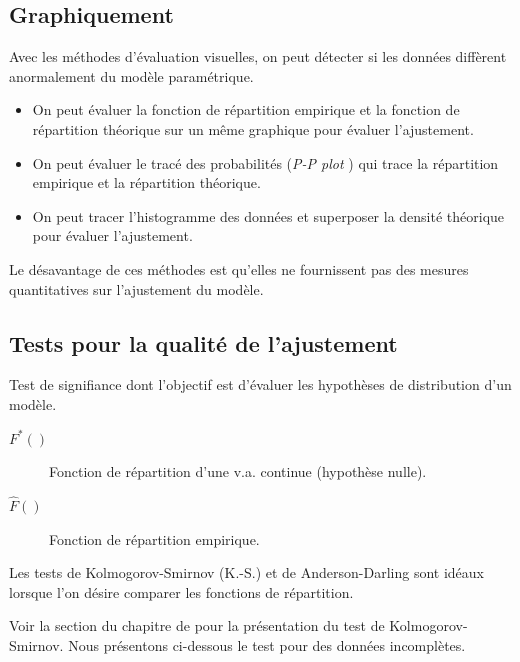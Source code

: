 \documentclass[french]{article}
\begin{document}
\begin{multicols*}{2}
\subsection{Graphiquement}
Avec les méthodes d'évaluation visuelles, on peut détecter si les données diffèrent anormalement du modèle paramétrique.
\begin{itemize}
	\item	On peut évaluer la fonction de répartition empirique et la fonction de répartition théorique sur un même graphique pour évaluer l'ajustement.
	\item	On peut évaluer le tracé des probabilités (\og \textit{P-P plot} \fg{}) qui trace la répartition empirique et la répartition théorique.
	\item	On peut tracer l'histogramme des données et superposer la densité théorique pour évaluer l'ajustement.
\end{itemize}

Le désavantage de ces méthodes est qu'elles ne fournissent pas des mesures quantitatives sur l'ajustement du modèle.


\subsection{Tests pour la qualité de l'ajustement}\label{subsec:QualAjusTests}
\begin{definitionNOHFILL}
Test de signifiance dont l'objectif est d'évaluer les hypothèses de distribution d'un modèle.

\end{definitionNOHFILL}

\begin{distributions}[Notation]
\begin{description}
	\item[$F^{\ast}()$]	Fonction de répartition d'une v.a. continue (hypothèse nulle).
	\item[$\hat{F}()$]	Fonction de répartition empirique.
\end{description}
\end{distributions}

Les tests de Kolmogorov-Smirnov (K.-S.) et de Anderson-Darling sont idéaux lorsque l'on désire comparer les fonctions de répartition. 

\bigskip

Voir la section \textit{\underline{}} du chapitre de \textit{\underline{}} pour la présentation du test de Kolmogorov-Smirnov. Nous présentons ci-dessous le test pour des données incomplètes.


\end{multicols*}
\end{document}
